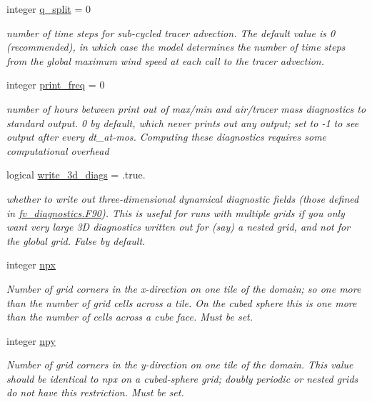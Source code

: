 \begin{DoxyCompactItemize}
integer \hyperlink{structfv__arrays__mod_1_1fv__flags__type_a4ff876f01dc3da4224abaacc098a784a}{q\-\_\-split} = 0
\begin{DoxyCompactList}\small\item\em number of time steps for sub-\/cycled tracer advection. The default value is 0 (recommended), in which case the model determines the number of time steps from the global maximum wind speed at each call to the tracer advection. \end{DoxyCompactList}\item 
integer \hyperlink{structfv__arrays__mod_1_1fv__flags__type_abd877505252f024667e166f6bedb0e7e}{print\-\_\-freq} = 0
\begin{DoxyCompactList}\small\item\em number of hours between print out of max/min and air/tracer mass diagnostics to standard output. 0 by default, which never prints out any output; set to -\/1 to see output after every dt\-\_\-at-\/mos. Computing these diagnostics requires some computational overhead \end{DoxyCompactList}\item 
logical \hyperlink{structfv__arrays__mod_1_1fv__flags__type_a1cb6e1fb7a4269f6ee15957997f5f310}{write\-\_\-3d\-\_\-diags} = .true.
\begin{DoxyCompactList}\small\item\em whether to write out three-\/dimensional dynamical diagnostic fields (those defined in \hyperlink{fv__diagnostics_8F90}{fv\-\_\-diagnostics.\-F90}). This is useful for runs with multiple grids if you only want very large 3\-D diagnostics written out for (say) a nested grid, and not for the global grid. False by default. \end{DoxyCompactList}\item 
integer \hyperlink{structfv__arrays__mod_1_1fv__flags__type_aaa16c08170125d003288233052c8afb1}{npx}
\begin{DoxyCompactList}\small\item\em Number of grid corners in the x-\/direction on one tile of the domain; so one more than the number of grid cells across a tile. On the cubed sphere this is one more than the number of cells across a cube face. Must be set. \end{DoxyCompactList}\item 
integer \hyperlink{structfv__arrays__mod_1_1fv__flags__type_a98afcbae0a03aa53ad61562cb671b12e}{npy}
\begin{DoxyCompactList}\small\item\em Number of grid corners in the y-\/direction on one tile of the domain. This value should be identical to npx on a cubed-\/sphere grid; doubly periodic or nested grids do not have this restriction. Must be set. \end{DoxyCompactList}\item 

\end{DoxyCompactItemize}
